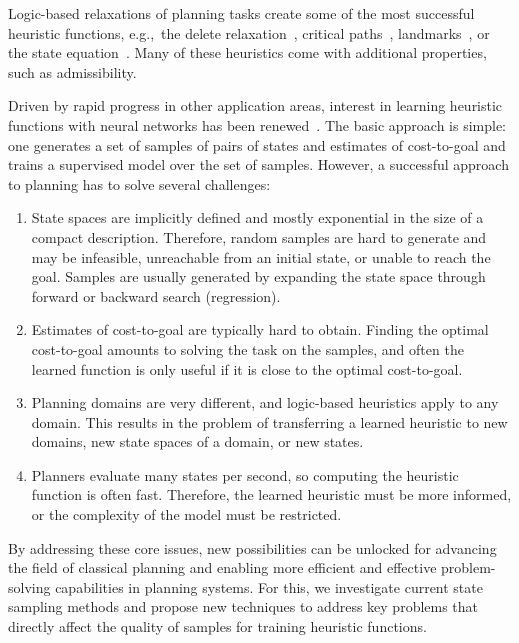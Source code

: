 Logic-based relaxations of planning tasks create some of the most successful heuristic functions, e.g.,~the delete relaxation~\cite{Hoffmann.Nebel/2001}, critical paths~\cite{haslum-geffner-aips2000}, landmarks~\cite{hoffmann-et-al-jair2004,Karpas.Domshlak/2009}, or the state equation~\cite{bonet-ijcai2013}. Many of these heuristics come with additional properties, such as admissibility.

Driven by rapid progress in other application areas, interest in learning heuristic functions with neural networks has been renewed~\cite{samadi-et-al-aaai2008,Arfaee.etal/2011,Agostinelli.etal/2019,Yu.etal/2020,Shen.etal/2020,Ferber.etal/2020a,Toyer.etal/2020,Ferber.etal/2022,OToole/2022}. The basic approach is simple: one generates a set of samples of pairs of states and estimates of cost-to-goal and trains a supervised model over the set of samples. However, a successful approach to planning has to solve several challenges:

\begin{enumerate}[label=C\arabic*),left=0pt]
    \itemsep0pt
    \item State spaces are implicitly defined and mostly exponential in the size of a compact description. Therefore, random samples are hard to generate and may be infeasible, unreachable from an initial state, or unable to reach the goal. Samples are usually generated by expanding the state space through forward or backward search (regression).
    \item Estimates of cost-to-goal are typically hard to obtain. Finding the optimal cost-to-goal amounts to solving the task on the samples, and often the learned function is only useful if it is close to the optimal cost-to-goal.
    \item Planning domains are very different, and logic-based heuristics apply to any domain. This results in the problem of transferring a learned heuristic to new domains, new state spaces of a domain, or new states.
    \item Planners evaluate many states per second, so computing the heuristic function is often fast. Therefore, the learned heuristic must be more informed, or the complexity of the model must be restricted.
\end{enumerate}

By addressing these core issues, new possibilities can be unlocked for advancing the field of classical planning and enabling more efficient and effective problem-solving capabilities in planning systems. For this, we investigate current state sampling methods and propose new techniques to address key problems that directly affect the quality of samples for training heuristic functions.

